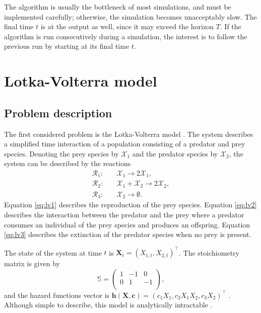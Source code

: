 The algorithm is usually the bottleneck of most simulations, and must be implemented carefully; otherwise, the simulation becomes unacceptably slow. The final time $t$ is at the output as well, since it may exceed the horizon $T$. If the algorithm is run consecutively during a simulation, the interest is to follow the previous run by starting at its final time $t$.

\section{Lotka-Volterra model} \label{sec:lotka-volterra}
\subsection{Problem description}
The first considered problem is the Lotka-Volterra model \citep{lotka, volterra}. The system describes a simplified time interaction of a population consisting of a predator and prey species. Denoting the prey species by $\mathcal{X}_1$ and the predator species by $\mathcal{X}_2$, the system can be described by the reactions
\begin{align}
\mathcal{R}_1:\quad & \mathcal{X}_1 \to 2 \mathcal{X}_1, \label{eq:lv1} \\
\mathcal{R}_2:\quad & \mathcal{X}_1 + \mathcal{X}_2 \to 2 \mathcal{X}_2, \label{eq:lv2} \\
\mathcal{R}_3:\quad & \mathcal{X}_2 \to \emptyset. \label{eq:lv3}
\end{align}
Equation \eqref{eq:lv1} describes the reproduction of the prey species. Equation \eqref{eq:lv2} describes the interaction between the predator and the prey where a predator consumes an individual of the prey species and produces an offspring. Equation \eqref{eq:lv3} describes the extinction of the predator species when no prey is present.

The state of the system at time $t$ is $\bm{X}_t = \left(X_{1,t}, X_{2,t}\right)^\intercal$. The stoichiometry matrix is given by
\begin{equation*}
\mathbb{S} = \begin{pmatrix}
1 & -1 & 0 \\
0 & 1 & -1 \\
\end{pmatrix},
\end{equation*}
and the hazard functions vector is $\bm{h}(\bm{X}, \bm{c}) = \left(c_1 X_{1}, c_2 X_{1} X_{2}, c_3 X_{2}\right)^\intercal$ \citep{wilkinson}. Although simple to describe, this model is analytically intractable \citep{wilkinson-book}.

